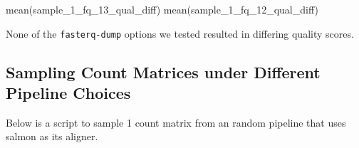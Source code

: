 \documentclass[
  letterpaper,
]{article}
\newenvironment{Shaded}{\begin{snugshade}}{\end{snugshade}}
\newcommand{\FunctionTok}[1]{\textcolor[rgb]{0.28,0.35,0.67}{#1}}
\newcommand{\NormalTok}[1]{\textcolor[rgb]{0.00,0.23,0.31}{#1}}
\begin{document}
\begin{Shaded}
\begin{Highlighting}[]
\FunctionTok{mean}\NormalTok{(sample\_1\_fq\_13\_qual\_diff)}
\FunctionTok{mean}\NormalTok{(sample\_1\_fq\_12\_qual\_diff)}
\end{Highlighting}
\end{Shaded}

None of the \texttt{fasterq-dump} options we tested resulted in
differing quality scores.

\hypertarget{sampling-count-matrices-under-different-pipeline-choices}{%
\subsection{Sampling Count Matrices under Different Pipeline
Choices}\label{sampling-count-matrices-under-different-pipeline-choices}}

Below is a script to sample 1 count matrix from an random pipeline that
uses salmon as its aligner.
\end{document}
